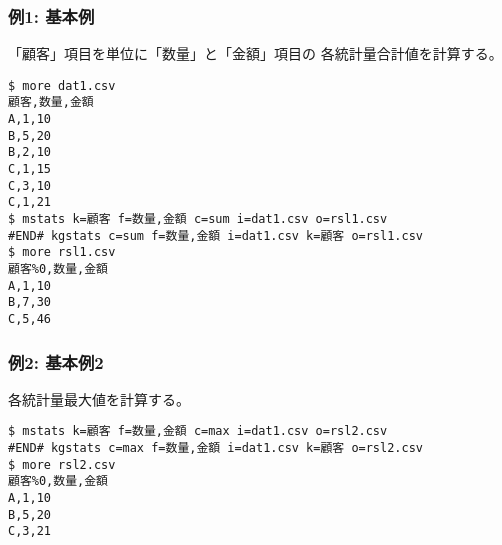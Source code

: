 \subsubsection*{例1: 基本例}

「顧客」項目を単位に「数量」と「金額」項目の
各統計量合計値を計算する。


\begin{Verbatim}[baselinestretch=0.7,frame=single]
$ more dat1.csv
顧客,数量,金額
A,1,10
B,5,20
B,2,10
C,1,15
C,3,10
C,1,21
$ mstats k=顧客 f=数量,金額 c=sum i=dat1.csv o=rsl1.csv
#END# kgstats c=sum f=数量,金額 i=dat1.csv k=顧客 o=rsl1.csv
$ more rsl1.csv
顧客%0,数量,金額
A,1,10
B,7,30
C,5,46
\end{Verbatim}
\subsubsection*{例2: 基本例2}

各統計量最大値を計算する。


\begin{Verbatim}[baselinestretch=0.7,frame=single]
$ mstats k=顧客 f=数量,金額 c=max i=dat1.csv o=rsl2.csv
#END# kgstats c=max f=数量,金額 i=dat1.csv k=顧客 o=rsl2.csv
$ more rsl2.csv
顧客%0,数量,金額
A,1,10
B,5,20
C,3,21
\end{Verbatim}
